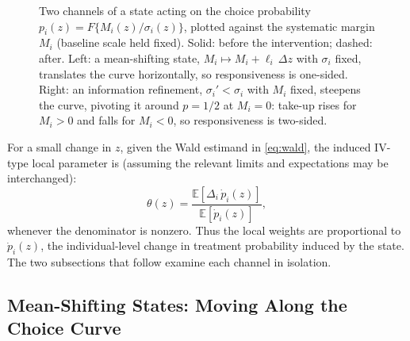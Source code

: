 \documentclass[11pt]{article}
\newcommand{\E}{\mathbb{E}}
\newcommand{\1}{\mathbf{1}}
\begin{document}
\begin{figure}[t]
\centering
{}
\hfill
{}
\caption{Two channels of a state acting on the choice probability
$p_i(z)=F\{M_i(z)/\sigma_i(z)\}$, plotted against the systematic margin $M_i$
(baseline scale held fixed). Solid: before the intervention; dashed: after.
Left: a mean-shifting state, $M_i \mapsto M_i+\ell_i\,\Delta z$ with $\sigma_i$
fixed, translates the curve horizontally, so responsiveness is one-sided.
Right: an information refinement, $\sigma_i' < \sigma_i$ with $M_i$ fixed,
steepens the curve, pivoting it around $p=1/2$ at $M_i=0$: take-up rises for
$M_i>0$ and falls for $M_i<0$, so responsiveness is two-sided.}
 \label{fig:choice_curve}
\end{figure}
 
For a small change in \(z\), given the Wald estimand in \eqref{eq:wald},
the induced IV-type local parameter is (assuming the relevant limits and
expectations may be interchanged):
\[
\theta(z)
=
\frac{\E[\Delta_i\,\dot p_i(z)]}{\E[\dot p_i(z)]},
\]
whenever the denominator is nonzero. Thus the local weights are proportional
to \(\dot p_i(z)\), the individual-level change in treatment probability
induced by the state. The two subsections that follow examine each channel
in isolation.

\subsection{Mean-Shifting States: Moving Along the Choice Curve}
\label{sec:location}
\end{document}
